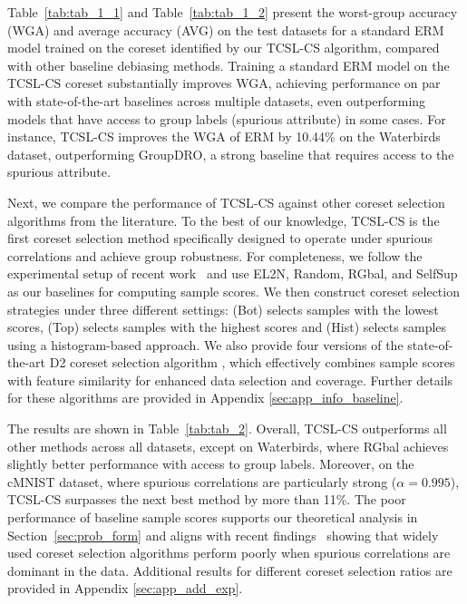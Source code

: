 \documentclass[letter,11pt]{article}
\begin{document}
Table~\ref{tab:tab_1_1} and Table~\ref{tab:tab_1_2} present the worst-group accuracy (WGA) and average accuracy (AVG) on the test datasets for a standard ERM model trained on the coreset identified by our TCSL-CS algorithm, compared with other baseline debiasing methods. Training a standard ERM model on the TCSL-CS coreset substantially improves WGA, achieving performance on par with state-of-the-art baselines across multiple datasets, even outperforming models that have access to group labels (spurious attribute) in some cases. For instance, TCSL-CS improves the WGA of ERM by 10.44\% on the Waterbirds dataset, outperforming GroupDRO, a strong baseline that requires access to the spurious attribute.

Next, we compare the performance of TCSL-CS against other coreset selection algorithms from the literature. To the best of our knowledge, TCSL-CS is the first coreset selection method specifically designed to operate under spurious correlations and achieve group robustness. For completeness, we follow the experimental setup of recent work~\citep{CS_LR} and use EL2N, Random, RGbal, and SelfSup as our baselines for computing sample scores. We then construct coreset selection strategies under three different settings: (Bot) selects samples with the lowest scores, (Top) selects samples with the highest scores and (Hist) selects samples using a histogram-based approach. We also provide four versions of the state-of-the-art D2 coreset selection algorithm \citep{D2}, which effectively combines sample scores with feature similarity for enhanced data selection and coverage. Further details for these algorithms are provided in Appendix \ref{sec:app_info_baseline}.

The results are shown in Table~\ref{tab:tab_2}. Overall, TCSL-CS outperforms all other methods across all datasets, except on Waterbirds, where RGbal achieves slightly better performance with access to group labels. Moreover, on the cMNIST dataset, where spurious correlations are particularly strong ($\alpha = 0.995$), TCSL-CS surpasses the next best method by more than 11\%. The poor performance of baseline sample scores supports our theoretical analysis in Section~\ref{sec:prob_form} and aligns with recent findings~\citep{CS_LR} showing that widely used coreset selection algorithms perform poorly when spurious correlations are dominant in the data. Additional results for different coreset selection ratios are provided in Appendix \ref{sec:app_add_exp}.
\end{document}
